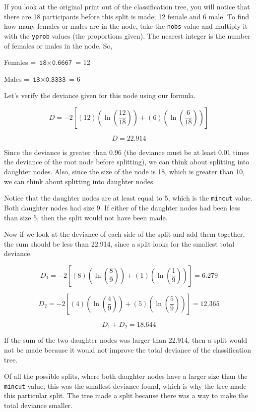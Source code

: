 \documentclass[12pt,twoside]{reedthesis}
\begin{document}
  If you look at the original print out of the classification tree, you
  will notice that there are 18 participants before this split is made; 12
  female and 6 male. To find how many females or males are in the node,
  take the \texttt{nobs} value and multiply it with the \texttt{yprob}
  values (the proportions given). The nearest integer is the number of
  females or males in the node. So,
  
  Females = \(\texttt{18}\times\texttt{0.6667}\) = 12
  
  Males = \(\texttt{18}\times\texttt{0.3333}\) = 6
  
  \newpage
  
  Let's verify the deviance given for this node using our formula.
  
  \[D = -2[(12)(\ln(\frac{12}{18})) + (6)(\ln(\frac{6}{18}))]\]
  
  \[D = 22.914\]
  
  Since the deviance is greater than 0.96 (the deviance must be at least
  0.01 times the deviance of the root node before splitting), we can think
  about splitting into daughter nodes. Also, since the size of the node is
  18, which is greater than 10, we can think about splitting into daughter
  nodes.
  
  Notice that the daughter nodes are at least equal to 5, which is the
  \texttt{mincut} value. Both daughter nodes had size 9. If either of the
  daughter nodes had been less than size 5, then the split would not have
  been made.
  
  Now if we look at the deviance of each side of the split and add them
  together, the sum should be less than 22.914, since a split looks for
  the smallest total deviance.
  
  \[D_1 = -2[(8)(\ln(\frac{8}{9})) + (1)(\ln(\frac{1}{9}))] = 6.279\]
  
  \[D_2 = -2[(4)(\ln(\frac{4}{9})) + (5)(\ln(\frac{5}{9}))] = 12.365\]
  
  \[D_1 + D_2 = 18.644\]
  
  If the sum of the two daughter nodes was larger than 22.914, then a
  split would not be made because it would not improve the total deviance
  of the classification tree.
  
  Of all the possible splits, where both daughter nodes have a larger size
  than the \texttt{mincut} value, this was the smallest deviance found,
  which is why the tree made this particular split. The tree made a split
  because there was a way to make the total deviance smaller.
  
\end{document}
